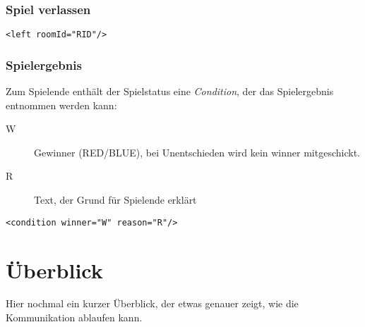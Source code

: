 \documentclass[12pt,a4paper, ngerman, oneside]{scrartcl}
\begin{document}
\section{Spiel verlassen}
\begin{verbatim}
<left roomId="RID"/>
\end{verbatim}


\section{\label{gameend}Spielergebnis}
Zum Spielende enthält der Spielstatus eine \textit{Condition}, der das Spielergebnis entnommen werden kann:
\begin{description}
\item[W] Gewinner (RED/BLUE), bei Unentschieden wird kein winner mitgeschickt.
\item[R] Text, der Grund für Spielende erklärt
\end{description}
\begin{verbatim}
<condition winner="W" reason="R"/>
\end{verbatim}

\newpage
\part{Überblick}
Hier nochmal ein kurzer Überblick, der etwas genauer zeigt, wie die Kommunikation ablaufen kann.\bigskip\\
\end{document}
